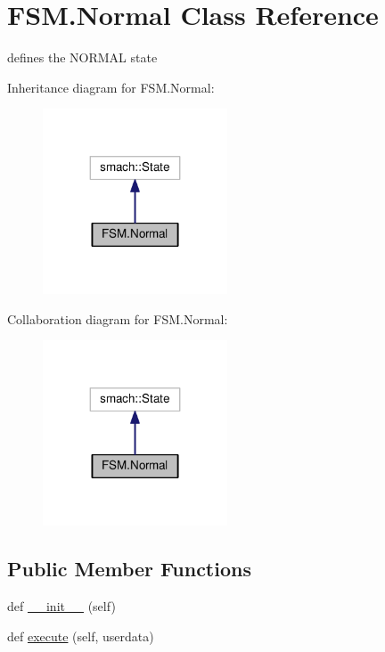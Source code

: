 \hypertarget{classFSM_1_1Normal}{}\section{F\+S\+M.\+Normal Class Reference}
\label{classFSM_1_1Normal}


defines the N\+O\+R\+M\+AL state  




Inheritance diagram for F\+S\+M.\+Normal\+:\nopagebreak
\begin{figure}[H]
\begin{center}
\leavevmode
\includegraphics[width=155pt]{classFSM_1_1Normal__inherit__graph}
\end{center}
\end{figure}


Collaboration diagram for F\+S\+M.\+Normal\+:\nopagebreak
\begin{figure}[H]
\begin{center}
\leavevmode
\includegraphics[width=155pt]{classFSM_1_1Normal__coll__graph}
\end{center}
\end{figure}
\subsection*{Public Member Functions}
\begin{DoxyCompactItemize}
\item 
def \hyperlink{classFSM_1_1Normal_a21e63c972c3a4b1417c60b5d18ea18bd}{\+\_\+\+\_\+init\+\_\+\+\_\+} (self)
\item 
def \hyperlink{classFSM_1_1Normal_ae85b3201d4649dac559f39d327f76f6e}{execute} (self, userdata)
\end{DoxyCompactItemize}
